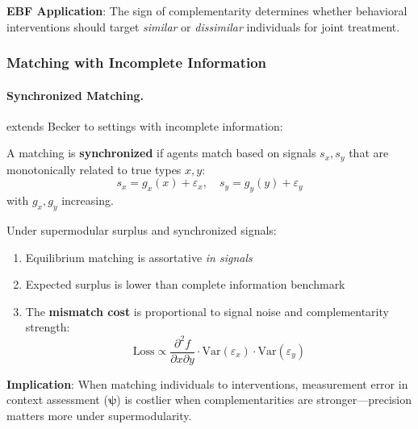 \textbf{EBF Application}: The sign of complementarity determines whether 
behavioral interventions should target \emph{similar} or \emph{dissimilar} individuals 
for joint treatment.

\subsubsection{Matching with Incomplete Information}

\paragraph{Synchronized Matching.}

\citet{johnson2019synchronized} extends Becker to settings with incomplete information:

\begin{definition}
\label{def:synchronized}
A matching is \textbf{synchronized} if agents match based on signals $s_x, s_y$ 
that are monotonically related to true types $x, y$:
\begin{equation}
s_x = g_x(x) + \varepsilon_x, \quad s_y = g_y(y) + \varepsilon_y
\end{equation}
with $g_x, g_y$ increasing.
\end{definition}

\begin{theorem}
\label{thm:incomplete-assort}
Under supermodular surplus and synchronized signals:
\begin{enumerate}
    \item Equilibrium matching is assortative \emph{in signals}
    \item Expected surplus is lower than complete information benchmark
    \item The \textbf{mismatch cost} is proportional to signal noise and 
    complementarity strength:
    \begin{equation}
    \text{Loss} \propto \frac{\partial^2 f}{\partial x \partial y} \cdot 
    \text{Var}(\varepsilon_x) \cdot \text{Var}(\varepsilon_y)
    \end{equation}
\end{enumerate}
\end{theorem}

\textbf{Implication}: When matching individuals to interventions, measurement error 
in context assessment ($\boldsymbol{\psi}$) is costlier when complementarities are 
stronger---precision matters more under supermodularity.

